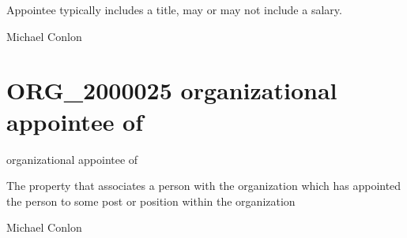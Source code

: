 \documentclass[letterpaper,10pt,english]{sphinxmanual}
\begin{document}
\begin{sphinxShadowBox}

\sphinxAtStartPar
Appointee typically includes a title, may or may not include a salary.
\end{sphinxShadowBox}

\begin{sphinxShadowBox}

\sphinxAtStartPar
Michael Conlon 
\end{sphinxShadowBox}
\begin{quote}
\label{\detokenize{doc-ORG_2000025:org-2000025}}\label{\detokenize{doc-ORG_2000025:organizational-appointee-of}}\label{\detokenize{doc-ORG_2000025:org-2000025}}
\ignorespaces \end{quote}


\section{ORG\_2000025 \sphinxhyphen{} organizational appointee of}
\label{\detokenize{doc-ORG_2000025:org-2000025-organizational-appointee-of}}\label{\detokenize{doc-ORG_2000025:index-0}}\label{\detokenize{doc-ORG_2000025::doc}}
\begin{sphinxShadowBox}

\sphinxAtStartPar
organizational appointee of
\end{sphinxShadowBox}

\begin{sphinxShadowBox}

\sphinxAtStartPar
The property that associates a person with the organization which has appointed the person to some post or position within the organization
\end{sphinxShadowBox}

\begin{sphinxShadowBox}

\sphinxAtStartPar
Michael Conlon 
\end{sphinxShadowBox}
\end{document}
